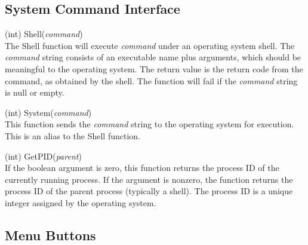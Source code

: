 \subsection{System Command Interface}

\begin{description}
\item{(int) \vt Shell({\it command\/})}\\
The {\vt Shell} function will execute {\it command\/} under an
operating system shell.  The {\it command\/} string consists of an
executable name plus arguments, which should be meaningful to the
operating system.  The return value is the return code from the
command, as obtained by the shell.  The function will fail if the {\it
command} string is null or empty.

\item{(int) \vt System({\it command\/})}\\
This function sends the {\it command} string to the operating system
for execution.  This is an alias to the {\vt Shell} function.

\item{(int) \vt GetPID({\it parent\/})}\\
If the boolean argument is zero, this function returns the process ID
of the currently running {\Xic} process.  If the argument is nonzero,
the function returns the process ID of the parent process (typically a
shell).  The process ID is a unique integer assigned by the operating
system.

\end{description}


\subsection{Menu Buttons}

